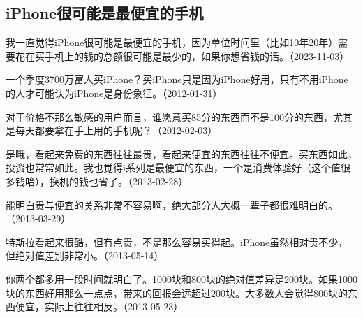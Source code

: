 \subsection{iPhone很可能是最便宜的手机}

我一直觉得iPhone很可能是最便宜的手机，因为单位时间里（比如10年20年）需要花在买手机上的钱的总额很可能是最少的，如果你想省钱的话。（2023-11-03）


一个季度3700万富人买iPhone？买iPhone只是因为iPhone好用，只有不用iPhone的人才可能认为iPhone是身份象征。（2012-01-31）


对于价格不那么敏感的用户而言，谁愿意买85分的东西而不是100分的东西，尤其是每天都要拿在手上用的手机呢？（2012-02-03）


是哦，看起来免费的东西往往最贵，看起来便宜的东西往往不便宜。买东西如此，投资也常常如此。我也觉得i系列是最便宜的东西，一个是消费体验好（这个值很多钱哈），换机的钱也省了。（2013-02-28）


能明白贵与便宜的关系非常不容易啊，绝大部分人大概一辈子都很难明白的。（2013-03-29）

特斯拉看起来很酷，但有点贵，不是那么容易买得起。iPhone虽然相对贵不少，但绝对值差别非常小。（2013-05-14）


你两个都多用一段时间就明白了。1000块和800块的绝对值差异是200块。如果1000块的东西好用那么一点点，带来的回报会远超过200块。大多数人会觉得800块的东西便宜，实际上往往相反。（2013-05-23）


